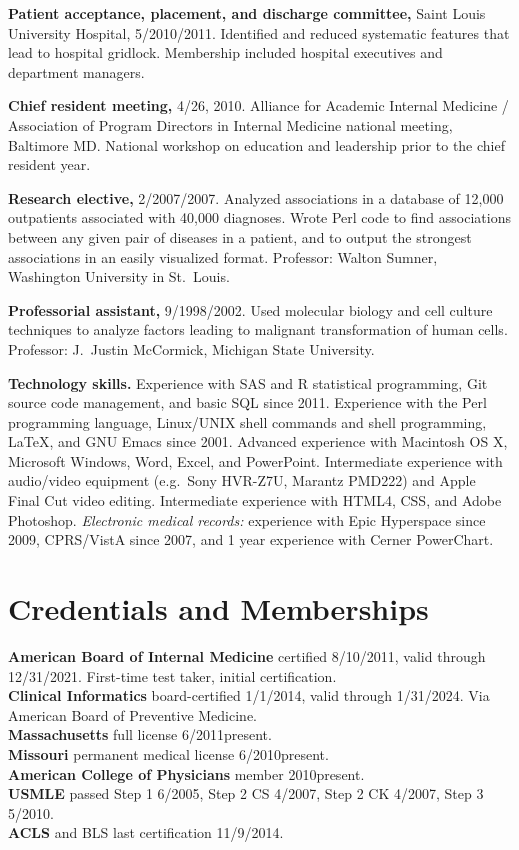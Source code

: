 \documentclass[12pt]{article}
\begin{document}
\textbf{Patient acceptance, placement, and discharge committee,} Saint
Louis University Hospital, 5/2010\ndash{}/2011. Identified
and reduced systematic features that lead to hospital gridlock.
Membership included hospital executives and department managers.


\textbf{Chief resident meeting,} 4/26, 2010. Alliance for
Academic Internal Medicine / Association of Program Directors in
Internal Medicine national meeting, Baltimore MD. National workshop on
education and leadership prior to the chief resident year.

\textbf{Research elective,} 2/2007/2007. Analyzed associations
in a database of 12,000 outpatients associated with 40,000 diagnoses.
Wrote Perl code to find associations between any given pair of
diseases in a patient, and to output the strongest associations in an
easily visualized format. Professor: Walton Sumner, Washington
University in St.\ Louis.

\textbf{Professorial assistant,} 9/1998/2002. Used molecular
biology and cell culture techniques to analyze factors leading to
malignant transformation of human cells. Professor: J.\ Justin
McCormick, Michigan State University.

\textbf{Technology skills.} Experience with SAS and R statistical
programming, Git source code management, and basic SQL since 2011.
Experience with the Perl programming language, Linux/UNIX shell
commands and shell programming, \LaTeX, and GNU Emacs since 2001.
Advanced experience with Macintosh OS X, Microsoft Windows, Word,
Excel, and PowerPoint. Intermediate experience with audio/video
equipment (e.g.\ Sony HVR-Z7U, Marantz PMD222) and Apple Final Cut
video editing. Intermediate experience with HTML4, CSS, and Adobe
Photoshop. \emph{Electronic medical records:} experience with Epic
Hyperspace since 2009, CPRS/VistA since 2007, and 1 year experience
with Cerner PowerChart.


\section*{Credentials and Memberships}

\textbf{American Board of Internal Medicine} certified 8/10/2011,
valid through 12/31/2021. First-time test taker, initial
certification.\\
\textbf{Clinical Informatics} board-certified 1/1/2014, valid through
1/31/2024. Via American Board of Preventive Medicine.\\
\textbf{Massachusetts} full license 6/2011\ndash{}present.\\
\textbf{Missouri} permanent medical license 6/2010\ndash{}present.\\
\textbf{American College of Physicians} member 2010\ndash{}present.\\
\textbf{USMLE} passed Step 1 6/2005, Step 2 CS 4/2007, Step 2 CK 4/2007, Step 3
5/2010.\\
\textbf{ACLS} and BLS last certification 11/9/2014.
\end{document}
